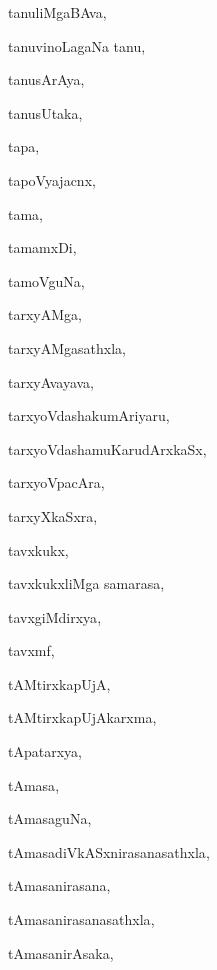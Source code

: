 \begin{multicols}{3}
{\noindent
{tanuliMgaBAva}, \pageref{tanuliMgaBAva}

\noindent
{tanuvinoLagaNa tanu}, \pageref{tanuvinoLagaNa tanu}

\noindent
{tanusArAya}, \pageref{tanusArAya}

\noindent
{tanusUtaka}, \pageref{tanusUtaka}

\noindent
{tapa}, \pageref{tapa}

\noindent
{tapoVyajacnx}, \pageref{tapoVyajacnx}

\noindent
{tama}, \pageref{tama}

\noindent
{tamamxDi}, \pageref{tamamxDi}

\noindent
{tamoVguNa}, \pageref{tamoVguNa}

\noindent
{tarxyAMga}, \pageref{tarxyAMga}

\noindent
{tarxyAMgasathxla}, \pageref{tarxyAMgasathxla}

\noindent
{tarxyAvayava}, \pageref{tarxyAvayava}

\noindent
{tarxyoVdashakumAriyaru}, \pageref{tarxyoVdashakumAriyaru}

\noindent
{tarxyoVdashamuKarudArxkaSx}, \pageref{tarxyoVdashamuKarudArxkaSx}

\noindent
{tarxyoVpacAra}, \pageref{tarxyoVpacAra}

\noindent
{tarxyXkaSxra}, \pageref{tarxyXkaSxra}

\noindent
{tavxkukx}, \pageref{tavxkukx}

\noindent
{tavxkukxliMga samarasa}, \pageref{tavxkukxliMga samarasa}

\noindent
{tavxgiMdirxya}, \pageref{tavxgiMdirxya}

\noindent
{tavxmf}, \pageref{tavxmf}

\noindent
{tAMtirxkapUjA}, \pageref{tAMtirxkapUjA}

\noindent
{tAMtirxkapUjAkarxma}, \pageref{tAMtirxkapUjAkarxma}

\noindent
{tApatarxya}, \pageref{tApatarxya}

\noindent
{tAmasa}, \pageref{tAmasa}

\noindent
{tAmasaguNa}, \pageref{tAmasaguNa}

\noindent
{tAmasadiVkASxnirasanasathxla}, \pageref{tAmasadiVkASxnirasanasathxla}

\noindent
{tAmasanirasana}, \pageref{tAmasanirasana}

\noindent
{tAmasanirasanasathxla}, \pageref{tAmasanirasanasathxla}

\noindent
{tAmasanirAsaka}, \pageref{tAmasanirAsaka}

}
\end{multicols}
